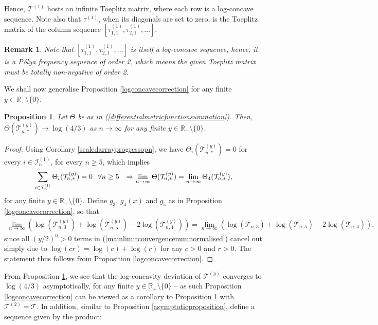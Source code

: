 \documentclass[a4paper,12pt]{article}
\newtheorem{rem}[thm]{Remark}
\newtheorem{prop}[thm]{Proposition}
\def\R{\mathbb{R}}
\def\T{\mathcal{T}}
\begin{document}
Hence, $\T^{(1)}$ hosts an infinite Toeplitz matrix, where each row is a log-concave sequence. Note also that $\tau^{(1)}$, when its diagonals are set to zero, is the Toeplitz matrix of the column sequence $[\tau^{(1)}_{1,1},\tau^{(1)}_{2,1},\ldots]$. 
\begin{rem}
Note that $[\tau^{(1)}_{1,1},\tau^{(1)}_{2,1},\ldots]$ is itself a log-concave sequence, hence, it is a Pólya frequency sequence of order 2, which means the given Toeplitz matrix must be totally non-negative of order 2. 
\end{rem}
We shall now generalise Proposition \ref{logconcavecorrection} for any finite $y\in\R_+\setminus\{0\}$.
\begin{prop}
\label{logconcavecorrectionnormalised}
Let $\Theta$ be as in (\ref{differentialmetricfunctionsummation}). Then, $\Theta(\T^{(y)}_{n,*}) \rightarrow \log(4/3)$ as $n \rightarrow \infty$ for any finite $y\in\R_+\setminus\{0\}$.
\end{prop}
\begin{proof}
Using Corollary \ref{scaledarrayprogressopn}, we have $\Theta_{i}\left( \T^{(y)}_{n,*} \right) = 0$ for every $i \in \mathcal{I}_{n}^{(1)}$, for every $n\geq 5$, which implies
\begin{align}
\sum_{i \in \mathcal{I}_{n}^{(1)}} \Theta_{i}( \T^{(y)}_{n,*} ) = 0 \hspace{0.1in} \text{$\forall n\geq 5$} \hspace{0.1in} \Rightarrow \lim_{n \rightarrow \infty}\Theta(\T^{(y)}_{n,*}) = \lim_{n \rightarrow \infty} \Theta_{4}(\T^{(y)}_{n,*}), \label{allzeroselsewherenormalised}
\end{align}
for any finite $y\in\R_+\setminus\{0\}$. Define $g_3$, $g_4(x)$  and $g_5$ as in Proposition \ref{logconcavecorrection}, so that
\begin{align}
\lim_{n \rightarrow \infty} \left(\log(\T^{(y)}_{n,3}) + \log(\T^{(y)}_{n,5}) - 2\log(\T^{(y)}_{n,4})\right) = \lim_{n \rightarrow \infty} \left(\log(\T_{n,3}) + \log(\T_{n,5}) - 2\log(\T_{n,4})\right), \label{mainlimitconvergencenumnormalised}
\end{align}
since all $(y/2)^n > 0$ terms in (\ref{mainlimitconvergencenumnormalised}) cancel out simply due to $\log(cr) = \log(c) + \log(r)$ for any $c > 0$ and $r>0$. The statement thus follows from Proposition \ref{logconcavecorrection}.
\end{proof}
From Proposition \ref{logconcavecorrectionnormalised}, we see that the log-concavity deviation of $\T^{(y)}$ converges to $\log(4/3)$ asymptotically, for any finite $y\in\R_+\setminus\{0\}$ -- as such Proposition \ref{logconcavecorrection} can be viewed as a corollary to Proposition \ref{logconcavecorrectionnormalised} with $\T^{(2)} = \T$. In addition, similar to Proposition \ref{asymptoticproposition}, define a sequence given by the product: 
\end{document}
